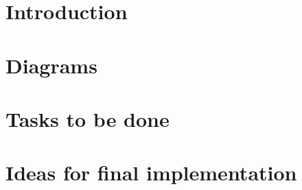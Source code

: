 \documentclass[a4paper,11pt,openbib]{report}
\begin{document}


\setlength\parindent{0pt} %

\renewcommand{\labelenumi}{\alph{enumi}.} %
\newpage
\tableofcontents
\newpage

\chapter{Introduction}


\chapter{Diagrams}


\chapter{Tasks to be done}


\chapter{Ideas for final implementation}



\pagebreak %

\end{document}
